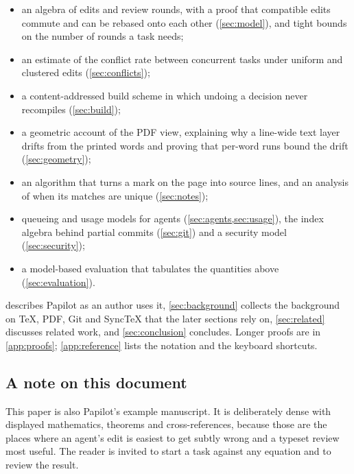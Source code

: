 \begin{itemize}
  \item an algebra of edits and review rounds, with a proof that compatible
    edits commute and can be rebased onto each other (\cref{sec:model}), and
    tight bounds on the number of rounds a task needs;
  \item an estimate of the conflict rate between concurrent tasks under uniform
    and clustered edits (\cref{sec:conflicts});
  \item a content-addressed build scheme in which undoing a decision never
    recompiles (\cref{sec:build});
  \item a geometric account of the PDF view, explaining why a line-wide text
    layer drifts from the printed words and proving that per-word runs bound
    the drift (\cref{sec:geometry});
  \item an algorithm that turns a mark on the page into source lines, and an
    analysis of when its matches are unique (\cref{sec:notes});
  \item queueing and usage models for agents (\cref{sec:agents,sec:usage}),
    the index algebra behind partial commits (\cref{sec:git}) and a security
    model (\cref{sec:security});
  \item a model-based evaluation that tabulates the quantities above
    (\cref{sec:evaluation}).
\end{itemize}

 describes Papilot as an author uses it, \cref{sec:background}
collects the background on \TeX{}, PDF, Git and SyncTeX that the later sections
rely on, \cref{sec:related} discusses related
work, and \cref{sec:conclusion} concludes. Longer proofs are in
\cref{app:proofs}; \cref{app:reference} lists the notation and the keyboard
shortcuts.

\subsection{A note on this document}

This paper is also Papilot's example manuscript. It is deliberately dense with
displayed mathematics, theorems and cross-references, because those are the
places where an agent's edit is easiest to get subtly wrong and a typeset
review most useful. The reader is invited to start a task against any equation
and to review the result.
